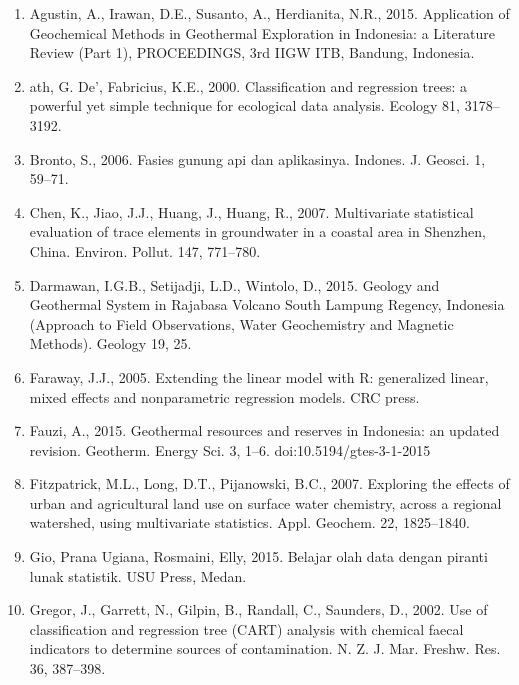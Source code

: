 \documentclass{sciposter}
\begin{document}
\begin{multicols}{3}
\begin{enumerate}

\item Agustin, A., Irawan, D.E., Susanto, A., Herdianita, N.R., 2015. Application of Geochemical Methods in Geothermal Exploration in Indonesia: a Literature Review (Part 1), PROCEEDINGS, 3rd IIGW ITB, Bandung, Indonesia.

\item ath, G. De’, Fabricius, K.E., 2000. Classification and regression trees: a powerful yet simple technique for ecological data analysis. Ecology 81, 3178–3192.

\item Bronto, S., 2006. Fasies gunung api dan aplikasinya. Indones. J. Geosci. 1, 59–71.

\item Chen, K., Jiao, J.J., Huang, J., Huang, R., 2007. Multivariate statistical evaluation of trace elements in groundwater in a coastal area in Shenzhen, China. Environ. Pollut. 147, 771–780.

\item Darmawan, I.G.B., Setijadji, L.D., Wintolo, D., 2015. Geology and Geothermal System in Rajabasa Volcano South Lampung Regency, Indonesia (Approach to Field Observations, Water Geochemistry and Magnetic Methods). Geology 19, 25.

\item Faraway, J.J., 2005. Extending the linear model with R: generalized linear, mixed effects and nonparametric regression models. CRC press.

\item Fauzi, A., 2015. Geothermal resources and reserves in Indonesia: an updated revision. Geotherm. Energy Sci. 3, 1–6. doi:10.5194/gtes-3-1-2015

\item Fitzpatrick, M.L., Long, D.T., Pijanowski, B.C., 2007. Exploring the effects of urban and agricultural land use on surface water chemistry, across a regional watershed, using multivariate statistics. Appl. Geochem. 22, 1825–1840.

\item Gio, Prana Ugiana, Rosmaini, Elly, 2015. Belajar olah data dengan piranti lunak statistik. USU Press, Medan.

\item Gregor, J., Garrett, N., Gilpin, B., Randall, C., Saunders, D., 2002. Use of classification and regression tree (CART) analysis with chemical faecal indicators to determine sources of contamination. N. Z. J. Mar. Freshw. Res. 36, 387–398.


\end{enumerate}
\end{multicols}
\end{document}
